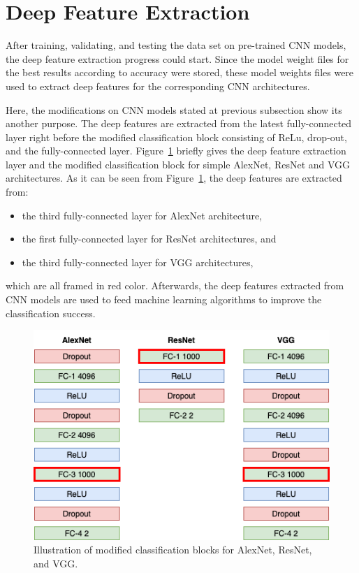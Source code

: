 \section{Deep Feature Extraction}

After training, validating, and testing the data set on pre-trained CNN models, the deep feature extraction progress could start. Since the model weight files for the best results according to accuracy were stored, these model weights files were used to extract deep features for the corresponding CNN architectures.

Here, the modifications on CNN models stated at previous subsection show its another purpose. The deep features are extracted from the latest fully-connected layer right before the modified classification block consisting of ReLu, drop-out, and the fully-connected layer. Figure~\ref{fig:modified_classification_blocks} briefly gives the deep feature extraction layer and the modified classification block for simple AlexNet, ResNet and VGG architectures. As it can be seen from Figure~\ref{fig:modified_classification_blocks}, the deep features are extracted from:

\begin{itemize}
	\item the third fully-connected layer for AlexNet architecture,
	\item the first fully-connected layer for ResNet architectures, and
	\item the third fully-connected layer for VGG architectures,
\end{itemize}

which are all framed in red color. 
Afterwards, the deep features extracted from CNN models are used to feed machine learning algorithms to improve the classification success.

\begin{figure}[h]
	\centering
	\includegraphics[width=.8\linewidth]{fig/modified_classification_blocks.png}
	\vspace{2mm}
	\caption{Illustration of modified classification blocks for AlexNet, ResNet, and VGG.}
	\label{fig:modified_classification_blocks}
\end{figure}

